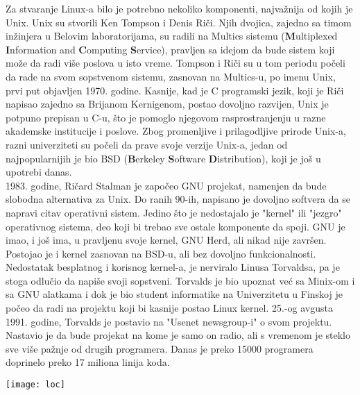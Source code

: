 Za stvaranje Linux-a bilo je potrebno nekoliko komponenti, najvažnija od kojih je Unix. Unix su stvorili Ken Tompson i Denis Riči. Njih dvojica, zajedno sa timom inžinjera u Belovim laboratorijama, su radili na Multics sistemu (\textbf{M}ultiplexed \textbf{I}nformation and \textbf{C}omputing \textbf{S}ervice), pravljen sa idejom da bude sistem koji može da radi više poslova u isto vreme. Tompson i Riči su u  tom periodu počeli da rade na svom sopstvenom sistemu, zasnovan na Multics-u, po imenu Unix, prvi put objavljen 1970. godine. Kasnije, kad je C programski jezik, koji je Riči napisao zajedno sa Brijanom Kernigenom, postao dovoljno razvijen, Unix je potpuno prepisan u C-u, što je pomoglo njegovom rasprostranjenju u razne akademske institucije i poslove. Zbog promenljive i prilagodljive prirode Unix-a, razni univerziteti su počeli da prave svoje verzije Unix-a, jedan od najpopularnijih je bio BSD (\textbf{B}erkeley \textbf{S}oftware \textbf{D}istribution), koji je još u upotrebi danas.\\

1983. godine, Ričard Stalman je započeo GNU projekat, namenjen da bude slobodna alternativa za Unix\cite{gnu}. Do ranih 90-ih, napisano je dovoljno softvera da se napravi citav operativni sistem. Jedino što je nedostajalo je "kernel" ili "jezgro" operativnog sistema, deo koji bi trebao sve ostale komponente da spoji. GNU je imao, i još ima, u pravljenu svoje kernel, GNU Herd, ali nikad nije završen. Postojao je i kernel zasnovan na BSD-u, ali bez dovoljno funkcionalnosti.\\

Nedostatak besplatnog i korisnog kernel-a, je nerviralo Linusa Torvaldsa, pa je stoga odlučio da napiše svoji sopstveni. Torvalds je bio upoznat već sa Minix-om i sa GNU alatkama i dok je bio student informatike na Univerzitetu u Finskoj je počeo da radi na projektu koji bi kasnije postao Linux kernel. 25.-og avgusta 1991. godine, Torvalds je postavio na "Usenet newsgroup-i" o svom projektu. Nastavio je da bude projekat na kome je samo on radio, ali s vremenom je steklo sve više pažnje od drugih programera. Danas je preko 15000 programera \cite{linuxfoundation} doprinelo preko 17 miliona linija koda.\\
\begin{center}
\texttt{[image: loc]}
\end{center}
